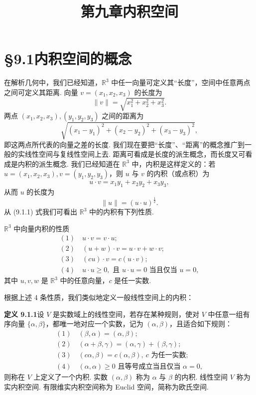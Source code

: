 \documentclass[UTF8, 12pt, fontset=fandol, oneside]{ctexart}
\title{第九章\quad 内积空间}
\author{}
\date{}
\begin{document}
\maketitle

\section*{§9.1\quad 内积空间的概念}

在解析几何中，我们已经知道，$\mathbb R^3$ 中任一向量可定义其``长度''，空间中任意两点之间可定义其距离. 向量 $v=(x_1,x_2,x_3)$ 的长度为
\[
  \|v\|=\sqrt{x_1^2+x_2^2+x_3^2}.
\]
两点 $(x_1,x_2,x_3),(y_1,y_2,y_3)$ 之间的距离为
\[
  \sqrt{(x_1-y_1)^2+(x_2-y_2)^2+(x_3-y_3)^2},
\]
即这两点所代表的向量之差的长度. 我们现在要把``长度''、``距离''的概念推广到一般的实线性空间与复线性空间上去. 距离可看成是长度的派生概念，而长度又可看成是内积的派生概念. 我们已经知道在 $\mathbb R^3$ 中，内积是这样定义的：若 $u=(x_1,x_2,x_3),v=(y_1,y_2,y_3)$，则 $u$ 与 $v$ 的内积（或点积）为
\begin{equation}
  u\cdot v=x_1y_1+x_2y_2+x_3y_3,
  \tag{9.1.1}
\end{equation}
从而 $u$ 的长度为
\[
  \|u\|=(u\cdot u)^{\frac12}.
\]
从 (9.1.1) 式我们可看出 $\mathbb R^3$ 中的内积有下列性质.

$\mathbb R^3$ 中向量内积的性质
\[
\begin{gathered}
  (1)\quad u\cdot v=v\cdot u;\\
  (2)\quad (u+w)\cdot v=u\cdot v+w\cdot v;\\
  (3)\quad (cu)\cdot v=c(u\cdot v);\\
  (4)\quad u\cdot u\ge 0,\text{ 且 }u\cdot u=0\text{ 当且仅当 }u=0,
\end{gathered}
\]
其中 $u,v,w$ 是 $\mathbb R^3$ 中的任意向量，$c$ 是任一实数.

根据上述 4 条性质，我们类似地定义一般线性空间上的内积：

\noindent\textbf{定义 9.1.1}\quad 设 $V$ 是实数域上的线性空间，若存在某种规则，使对 $V$ 中任意一组有序向量 $\{\alpha,\beta\}$，都唯一地对应一个实数，记为 $(\alpha,\beta)$，且适合如下规则：
\[
\begin{gathered}
  (1)\quad (\beta,\alpha)=(\alpha,\beta);\\
  (2)\quad (\alpha+\beta,\gamma)=(\alpha,\gamma)+(\beta,\gamma);\\
  (3)\quad (c\alpha,\beta)=c(\alpha,\beta),\ c\text{ 为任一实数};\\
  (4)\quad (\alpha,\alpha)\ge0\text{ 且等号成立当且仅当 }\alpha=0,
\end{gathered}
\]
则称在 $V$ 上定义了一个内积. 实数 $(\alpha,\beta)$ 称为 $\alpha$ 与 $\beta$ 的内积. 线性空间 $V$ 称为实内积空间. 有限维实内积空间称为 Euclid 空间，简称为欧氏空间.
\end{document}
